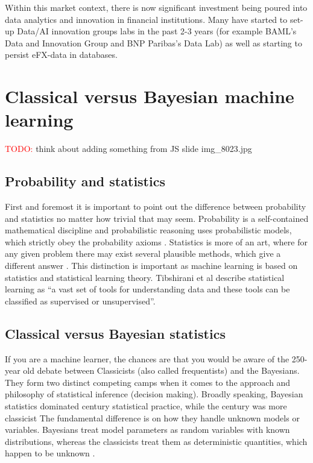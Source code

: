 Within this market context, there is now significant investment being poured into data analytics and innovation in financial institutions. Many have started to set-up Data/AI innovation groups labs in the past 2-3 years (for example BAML's Data and Innovation Group and BNP Paribas's Data Lab) as well as starting to persist eFX-data in databases.

\section{Classical versus Bayesian machine learning}\label{Sec:CvsB}

\textcolor{red}{TODO:}  think about adding something from JS slide img\_8023.jpg

\subsection{Probability and statistics}

First and foremost it is important to point out the difference between probability and statistics no matter how trivial that may seem. Probability is a self-contained mathematical discipline and probabilistic reasoning uses probabilistic models, which strictly obey the probability axioms \autocite{kolmogorov2018foundations}. Statistics is more of an art, where for any given problem there may exist several plausible methods, which give a different answer \autocite{bertsekas2002introduction}. This distinction is important as machine learning is based on statistics and statistical learning theory. Tibshirani et al \autocite{james2013introduction} describe statistical learning as ``a vast set of tools for understanding data and these tools can be classified as supervised or unsupervised''.

\subsection{Classical versus Bayesian statistics}
If you are a machine learner, the chances are that you would be aware of the 250-year old debate between Classicists (also called frequentists) and the Bayesians. They form two distinct competing camps when it comes to the approach and philosophy of statistical inference (decision making). Broadly speaking, Bayesian statistics dominated  century statistical practice, while the  century was more classicist \autocite{efron2005bayesians} The fundamental difference is on how they handle unknown models or variables. Bayesians treat model parameters as random variables with known distributions, whereas the classicists treat them as deterministic quantities, which happen to be unknown \autocite{bertsekas2002introduction}.


